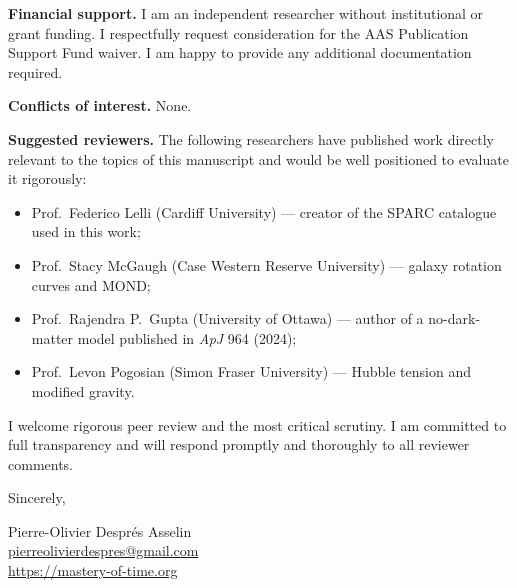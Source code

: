 \documentclass[12pt]{article}
\begin{document}
\textbf{Financial support.}
I am an independent researcher without institutional or grant funding.
I respectfully request consideration for the AAS Publication Support
Fund waiver.  I am happy to provide any additional documentation
required.

\textbf{Conflicts of interest.}
None.

\textbf{Suggested reviewers.}
The following researchers have published work directly relevant to the
topics of this manuscript and would be well positioned to evaluate it
rigorously:

\begin{itemize}
  \item Prof.\ Federico Lelli (Cardiff University) --- creator of the
    SPARC catalogue used in this work;
  \item Prof.\ Stacy McGaugh (Case Western Reserve University) ---
    galaxy rotation curves and MOND;
  \item Prof.\ Rajendra P.\ Gupta (University of Ottawa) --- author of
    a no-dark-matter model published in \textit{ApJ} 964 (2024);
  \item Prof.\ Levon Pogosian (Simon Fraser University) ---
    Hubble tension and modified gravity.
\end{itemize}

I welcome rigorous peer review and the most critical scrutiny.  I am
committed to full transparency and will respond promptly and thoroughly
to all reviewer comments.

\bigskip

Sincerely,

\bigskip\bigskip

Pierre-Olivier Despr\'{e}s Asselin \\
\href{mailto:pierreolivierdespres@gmail.com}{pierreolivierdespres@gmail.com} \\
\url{https://mastery-of-time.org}
\end{document}
